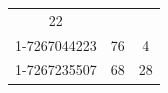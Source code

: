 \documentclass[]{article}
\begin{document}
\begin{longtable}[c]{@{}ccc@{}}
\begin{minipage}[t]{0.25\columnwidth}\centering\strut
22
\strut\end{minipage}\tabularnewline
\begin{minipage}[t]{0.16\columnwidth}\centering\strut
1-7267044223
\strut\end{minipage} &
\begin{minipage}[t]{0.33\columnwidth}\centering\strut
76
\strut\end{minipage} &
\begin{minipage}[t]{0.25\columnwidth}\centering\strut
4
\strut\end{minipage}\tabularnewline
\begin{minipage}[t]{0.16\columnwidth}\centering\strut
1-7267235507
\strut\end{minipage} &
\begin{minipage}[t]{0.33\columnwidth}\centering\strut
68
\strut\end{minipage} &
\begin{minipage}[t]{0.25\columnwidth}\centering\strut
28
\strut\end{minipage}\tabularnewline
\bottomrule
\end{longtable}
\end{document}
